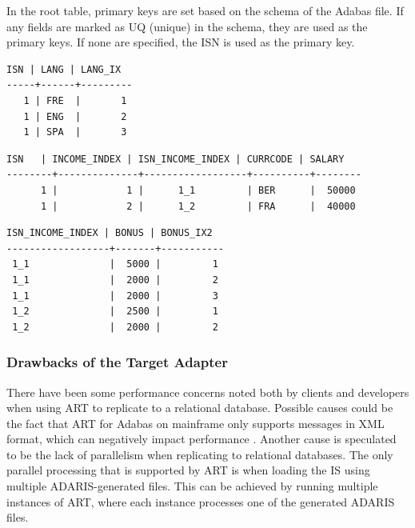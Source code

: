 In the root table, primary keys are set based on the schema of the Adabas file. If any fields are marked as UQ (unique) in the schema, they are used as the primary keys. If none are specified, the \ac{ISN} is used as the primary key.
\newpage
\begin{lstlisting}[frame=tb,caption={Query result of the MU field LANG in the relational table EMPL\_LANG},label=lst:bonusmuquery]
 ISN | LANG | LANG_IX
-----+------+---------
   1 | FRE  |       1
   1 | ENG  |       2
   1 | SPA  |       3
\end{lstlisting}

\begin{lstlisting}[frame=tb,caption={Query result of the PE field INCOME in the relational table EMPL\_INCOME},label=lst:incomepequery]
  ISN   | INCOME_INDEX | ISN_INCOME_INDEX | CURRCODE | SALARY
--------+--------------+------------------+----------+--------
      1 |            1 |      1_1         | BER      |  50000
      1 |            2 |      1_2         | FRA      |  40000
\end{lstlisting}
\begin{lstlisting}[frame=tb,caption={Query result of the MU field BONUS in the PE field INCOME in the relational table EMPL\_INCOME\_BONUS},label=lst:bonusmupequery]
 ISN_INCOME_INDEX | BONUS | BONUS_IX2
------------------+-------+-----------
 1_1              |  5000 |         1
 1_1              |  2000 |         2
 1_1              |  2000 |         3
 1_2              |  2500 |         1
 1_2              |  2000 |         2
\end{lstlisting}


\subsubsection{Drawbacks of the Target Adapter}
\label{ch02:fundamentals:adabas:art:limitations}
There have been some performance concerns noted both by clients and developers when using \ac{ART} to replicate to a relational database. Possible causes could be the fact that \ac{ART} for Adabas on mainframe only supports messages in XML format, which can negatively impact performance \cite{nicola2003xml}. Another cause is speculated to be the lack of parallelism when replicating to relational databases. The only parallel processing that is supported by \ac{ART} is when loading the \ac{IS} using multiple ADARIS-generated files. This can be achieved by running multiple instances of \ac{ART}, where each instance processes one of the generated ADARIS files.

